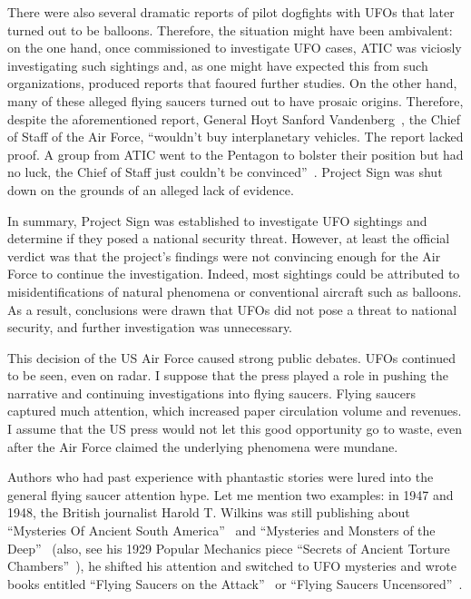 There were also several dramatic reports of pilot dogfights with UFOs that later turned out to be balloons.
Therefore, the situation might have been ambivalent: on the one hand, once commissioned to investigate UFO cases,
ATIC was viciosly investigating such sightings and, as one might have expected this from such organizations,
produced reports that faoured further studies.
On the other hand, many of these alleged flying saucers turned out to have prosaic origins.
Therefore, despite the aforementioned report,
General Hoyt Sanford Vandenberg~\cite{VandenbergUSAF}, the Chief of Staff of the Air Force,
``wouldn't buy interplanetary vehicles. The report lacked proof. A group from ATIC went
to the Pentagon to bolster their position but had no luck, the Chief of Staff just couldn't be convinced''~\cite[Chapter~3]{Ruppelt2011May}.
Project Sign was shut down on the grounds of an alleged lack of evidence.

In summary, Project Sign was established to investigate UFO sightings and determine if they posed a national security threat.
However, at least the official verdict was that the project's findings were not convincing enough for the Air Force
to continue the investigation.
Indeed, most sightings could be attributed to misidentifications of natural phenomena or conventional aircraft such as balloons.
As a result, conclusions were drawn that UFOs did not pose a threat to national security, and further investigation was unnecessary.

This decision of the US Air Force caused strong public debates. UFOs continued to be seen, even on radar.
I suppose that the press played a role in pushing the narrative and continuing investigations into flying saucers.
Flying saucers captured much attention, which increased paper circulation volume and revenues.
I assume that the US press would not let this good opportunity go to waste,
even after the Air Force claimed the underlying phenomena were mundane.

Authors who had past experience with phantastic stories were lured into the general flying saucer attention hype. Let me mention two examples: in 1947 and 1948, the British journalist Harold T. Wilkins was still publishing about
``Mysteries Of Ancient South America''~\cite{Wilkins1946} and ``Mysteries and Monsters of the Deep''~\cite{Wilkins2017Aug}
(also, see his 1929 Popular Mechanics piece ``Secrets of Ancient Torture Chambers''~\cite{Wilkins1929}),
he shifted his attention and switched to UFO mysteries and wrote books entitled
``Flying Saucers on the Attack''~\cite{Wilkins1954Jan} or  ``Flying Saucers Uncensored''~\cite{Wilkins1955}.

